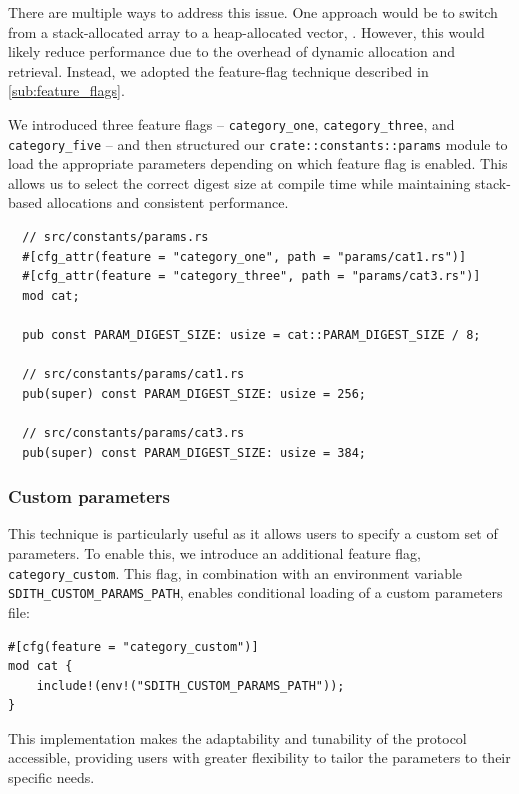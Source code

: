 \documentclass[11pt]{report}
\theoremstyle{definition}
\theoremstyle{plain}
\begin{document}
There are multiple ways to address this issue. One approach would be to switch from a stack-allocated array to a heap-allocated vector, . However, this would likely reduce performance due to the overhead of dynamic allocation and retrieval. Instead, we adopted the feature-flag technique described in \autoref{sub:feature_flags}.

We introduced three feature flags -- \texttt{category\_one}, \texttt{category\_three}, and \texttt{category\_five} -- and then structured our \texttt{crate::constants::params} module to load the appropriate parameters depending on which feature flag is enabled. This allows us to select the correct digest size at compile time while maintaining stack-based allocations and consistent performance.

\begin{verbatim}
  // src/constants/params.rs 
  #[cfg_attr(feature = "category_one", path = "params/cat1.rs")]
  #[cfg_attr(feature = "category_three", path = "params/cat3.rs")]
  mod cat; 

  pub const PARAM_DIGEST_SIZE: usize = cat::PARAM_DIGEST_SIZE / 8;

  // src/constants/params/cat1.rs
  pub(super) const PARAM_DIGEST_SIZE: usize = 256;

  // src/constants/params/cat3.rs
  pub(super) const PARAM_DIGEST_SIZE: usize = 384;
\end{verbatim}

\subsubsection{Custom parameters}\label{sub:custom_params}

This technique is particularly useful as it allows users to specify a custom set of parameters. To enable this, we introduce an additional feature flag, \texttt{category\_custom}. This flag, in combination with an environment variable \texttt{SDITH\_CUSTOM\_PARAMS\_PATH}, enables conditional loading of a custom parameters file:

\begin{verbatim}
#[cfg(feature = "category_custom")]
mod cat {
    include!(env!("SDITH_CUSTOM_PARAMS_PATH"));
}
\end{verbatim}

This implementation makes the adaptability and tunability of the protocol accessible, providing users with greater flexibility to tailor the parameters to their specific needs.
\end{document}
